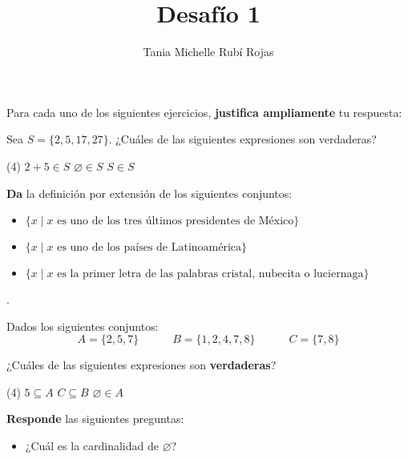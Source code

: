 \documentclass[oneside]{style}
\title{Desafío 1}
\author{Tania Michelle Rubí Rojas}
\begin{document}
\maketitle

Para cada uno de los siguientes ejercicios, \textbf{justifica ampliamente} tu 
respuesta:

\begin{questions}[label=\protect\circled{\bfseries\arabic*}]
    \question Sea $S = \{2,5,17,27\}$. ¿Cuáles de las siguientes expresiones 
    son verdaderas?
    \begin{tasks}(4)
        \task $2+5 \in S$
        \task $\varnothing \in S$
        \task $S \in S$
    \end{tasks}

    \question \textbf{Da} la definición por extensión de los siguientes 
    conjuntos:
    \begin{itemize}
        \item $\{x \; | \; x \text{ es uno de los tres últimos presidentes 
        de México}\}$
        
        \item $\{x \; | \; x \text{ es uno de los países de Latinoamérica}\}$
        
        \item $\{x \; | \; x \text{ es la primer letra de las palabras cristal, 
        nubecita o luciernaga}\}$
    \end{itemize}

    .

    \question Dados los siguientes conjuntos: 
    \begin{equation*}
        A = \{2,5,7\} \quad \quad \quad 
        B = \{1,2,4,7,8\} \quad \quad \quad
        C = \{7,8\}
    \end{equation*}

    ¿Cuáles de las siguientes expresiones son \textbf{verdaderas}?
    \begin{tasks}(4)
        \task $5 \subseteq A$
        \task $C \subseteq B$
        \task $\varnothing \in A$
    \end{tasks}

    \question \textbf{Responde} las siguientes preguntas:
    \begin{itemize}
        \item ¿Cuál es la cardinalidad de $\varnothing$?


\end{itemize}
\end{questions}
\end{document}
